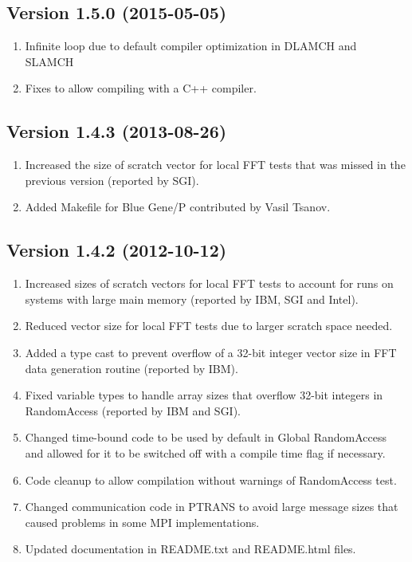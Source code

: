 \documentclass[twocolumn]{article}
\begin{document}
\subsection{Version 1.5.0 (2015-05-05)}
\begin{enumerate}
  \item Infinite loop due to default compiler optimization in DLAMCH and SLAMCH
  \item Fixes to allow compiling with a C++ compiler.
\end{enumerate}

\subsection{Version 1.4.3 (2013-08-26)}
\begin{enumerate}
\item Increased the size of scratch vector for local FFT tests that was
missed in the previous version (reported by SGI).
\item Added Makefile for Blue Gene/P contributed by Vasil Tsanov.
\end{enumerate}

\subsection{Version 1.4.2 (2012-10-12)}
\begin{enumerate}
\item Increased sizes of scratch vectors for local FFT tests to account for
runs on systems with large main memory (reported by IBM, SGI and Intel).
\item Reduced vector size for local FFT tests due to larger scratch space needed.
\item Added a type cast to prevent overflow of a 32-bit integer vector
  size in FFT data generation routine (reported by IBM).
\item Fixed variable types to handle array sizes that overflow 32-bit
  integers in RandomAccess (reported by IBM and SGI).
\item Changed time-bound code to be used by default in Global RandomAccess and
allowed for it to be switched off with a compile time flag if necessary.
\item Code cleanup to allow compilation without warnings of RandomAccess test.
\item Changed communication code in PTRANS to avoid large message sizes that
caused problems in some MPI implementations.
\item Updated documentation in README.txt and README.html files.
\end{enumerate}
\end{document}
